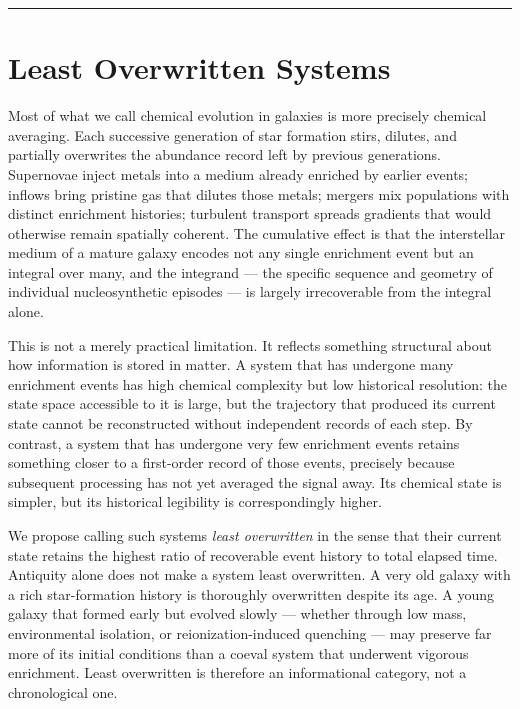 \documentclass[12pt, a4paper]{article}
\theoremstyle{definition}
\begin{document}
\vspace{1.0em}
\hrule
\vspace{1.4em}

\section{Least Overwritten Systems}
\label{sec:overwrite}

Most of what we call chemical evolution in galaxies is more precisely chemical
averaging. Each successive generation of star formation stirs, dilutes, and
partially overwrites the abundance record left by previous generations.
Supernovae inject metals into a medium already enriched by earlier events;
inflows bring pristine gas that dilutes those metals; mergers mix populations
with distinct enrichment histories; turbulent transport spreads gradients that
would otherwise remain spatially coherent. The cumulative effect is that the
interstellar medium of a mature galaxy encodes not any single enrichment event
but an integral over many, and the integrand --- the specific sequence and
geometry of individual nucleosynthetic episodes --- is largely irrecoverable
from the integral alone.

This is not a merely practical limitation. It reflects something structural
about how information is stored in matter. A system that has undergone many
enrichment events has high chemical complexity but low historical resolution:
the state space accessible to it is large, but the trajectory that produced
its current state cannot be reconstructed without independent records of each
step. By contrast, a system that has undergone very few enrichment events
retains something closer to a first-order record of those events, precisely
because subsequent processing has not yet averaged the signal away. Its
chemical state is simpler, but its historical legibility is correspondingly
higher.

We propose calling such systems \emph{least overwritten} in the sense that
their current state retains the highest ratio of recoverable event history to
total elapsed time. Antiquity alone does not make a system least overwritten.
A very old galaxy with a rich star-formation history is thoroughly overwritten
despite its age. A young galaxy that formed early but evolved slowly ---
whether through low mass, environmental isolation, or reionization-induced
quenching --- may preserve far more of its initial conditions than a coeval
system that underwent vigorous enrichment. Least overwritten is therefore an
informational category, not a chronological one.
\end{document}
